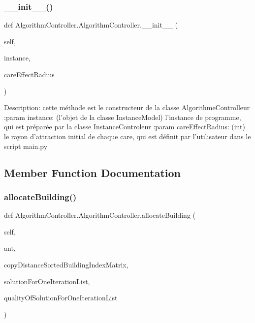 \subsubsection{\texorpdfstring{\+\_\+\+\_\+init\+\_\+\+\_\+()}{\_\_init\_\_()}}
{\footnotesize\ttfamily def Algorithm\+Controller.\+Algorithm\+Controller.\+\_\+\+\_\+init\+\_\+\+\_\+ (\begin{DoxyParamCaption}\item[{}]{self,  }\item[{}]{instance,  }\item[{}]{care\+Effect\+Radius }\end{DoxyParamCaption})}

\begin{DoxyVerb}Description: cette méthode est le constructeur de la classe AlgorithmeControlleur
:param instance: (l'objet de la classe InstanceModel) l'instance de programme,
            qui est préparée par la classe InstanceControleur
:param careEffectRadius: (int) le rayon d'attraction initial de chaque care, qui est définit par l'utilisateur
                    dans le script main.py
\end{DoxyVerb}
 

\subsection{Member Function Documentation}
\mbox{\label{class_algorithm_controller_1_1_algorithm_controller_aceaf2f248880e85bebd1d1c5a3ee50e2}} 
\subsubsection{\texorpdfstring{allocate\+Building()}{allocateBuilding()}}
{\footnotesize\ttfamily def Algorithm\+Controller.\+Algorithm\+Controller.\+allocate\+Building (\begin{DoxyParamCaption}\item[{}]{self,  }\item[{}]{ant,  }\item[{}]{copy\+Distance\+Sorted\+Building\+Index\+Matrix,  }\item[{}]{solution\+For\+One\+Iteration\+List,  }\item[{}]{quality\+Of\+Solution\+For\+One\+Iteration\+List }\end{DoxyParamCaption})}

